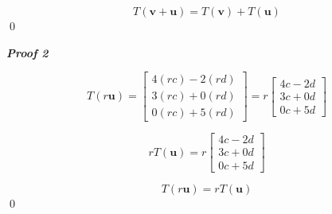 \documentclass[letter,11pt]{article}
\begin{document}
\begin{tcolorbox}[boxrule=1mm, width=(.9\linewidth),before=\hfill,after=\hfill,adjusted title={Problem \# 6.i Solutions}]
    $$T\left(\boldsymbol{v}+\boldsymbol{u}\right)=T\left(\boldsymbol{v}\right)+T\left(\boldsymbol{u}\right)$$ \qed
    
    \textbf{\textit{Proof 2}}
    
    $$T\left(r\boldsymbol{u}\right) =  \begin{bmatrix} 4(rc)-2(rd)\\ 3(rc)+0(rd)\\ 0(rc)+5(rd) \end{bmatrix} = r \begin{bmatrix} 4c-2d\\3c+0d\\0c+5d \end{bmatrix}$$

    $$rT(\boldsymbol{u}) = r \begin{bmatrix} 4c-2d\\3c+0d\\0c+5d \end{bmatrix}$$

     $$T\left(r\boldsymbol{u}\right) = rT(\boldsymbol{u})$$ \qed
\end{tcolorbox}
\end{document}
